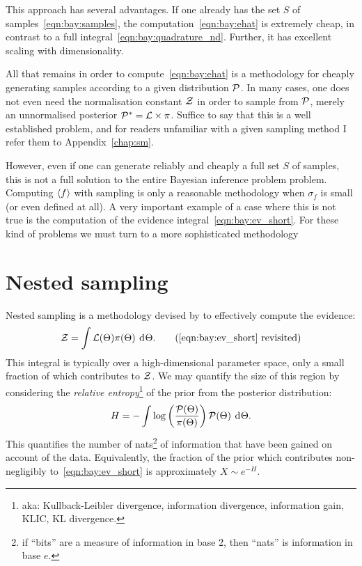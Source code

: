 This approach has several advantages. If one already has the set $S$ of samples~\eqref{eqn:bay:samples}, the computation~\eqref{eqn:bay:ehat} is extremely cheap, in contrast to a full integral~\eqref{eqn:bay:quadrature_nd}. Further, it has excellent scaling with dimensionality. 

All that remains in order to compute~\eqref{eqn:bay:ehat} is a methodology for cheaply generating samples according to a given distribution $\mathcal{P}$. In many cases, one does not even need the normalisation constant $\mathcal{Z}$ in order to sample from $\mathcal{P}$, merely an unnormalised posterior ${\mathcal{P}}^\ast= \mathcal{L}\times\pi$. Suffice to say that this is a well established problem, and for readers unfamiliar with a given sampling method I refer them to Appendix~\ref{chap:sm}.

However, even if one can generate reliably and cheaply a full set $S$ of samples, this is not a full solution to the entire Bayesian inference problem problem. Computing ${\left\langle{f}\right\rangle}$ with sampling is only a reasonable methodology when $\sigma_f$ is small (or even defined at all). A very important example of a case where this is not true is the computation of the evidence integral~\eqref{eqn:bay:ev_short}. For these kind of problems we must turn to a more sophisticated methodology



\section{Nested sampling}
\label{sec:bay:nested_sampling}
%
Nested sampling is a methodology devised by \citet{skilling2006} to effectively compute the evidence:
\begin{equation}
  \ev = \int \lik(\params) \prior(\params) \: \d{\params}.
  \tag{\ref{eqn:bay:ev_short} revisited}
\end{equation}
This integral is typically over a high-dimensional parameter space, only a small fraction of which contributes to $\mathcal{Z}$. We may quantify the size of this region by considering the {\em relative entropy\/}\footnote{aka: Kullback-Leibler divergence, information divergence, information gain, KLIC, KL divergence.} of the prior from the posterior distribution:
\begin{equation}
  H = -\int \log\left( \frac{\mathcal{P}(\Theta)}{\pi(\Theta)}\right) \mathcal{P}(\Theta)\: \operatorname{d}^{}\!{\Theta}.
  \label{eqn:bay:rel_ent}
\end{equation}  
This quantifies the number of nats\footnote{if ``bits'' are a measure of information in base 2, then ``nats'' is information in base $e$.} of information that have been gained on account of the data. Equivalently, the fraction of the prior which contributes non-negligibly to~\eqref{eqn:bay:ev_short} is approximately $X\sim e^{-H}$.

